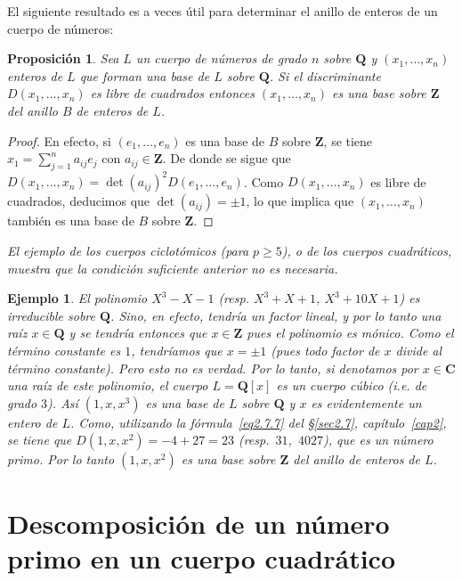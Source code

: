 \documentclass[10pt,oneside,bibtotoc,smallheadings,leqno,a5paper,DIV=12]{scrbook}
\newcommand{\QQ}{\mathbf{Q}}
\newcommand{\ZZ}{\mathbf{Z}}
\newcommand{\CC}{\mathbf{C}}
\numberwithin{equation}{section}
\newenvironment{comm}%
	{\begin{trivlist}\item\small\itshape}
	{\end{trivlist}}
\theoremstyle{defi}
\theoremstyle{enonce}
\newtheorem{proposition}{Proposici\'on}
\theoremstyle{rem}
\newtheorem*{example*}{Ejemplo}
\numberwithin{theorem}{section}
\numberwithin{proposition}{section}
\numberwithin{definition}{section}
\numberwithin{lemma}{section}
\numberwithin{corollary}{section}
\numberwithin{example}{section}
\numberwithin{footnote}{section}%
\begin{document}
El siguiente resultado es a veces \'util para determinar el anillo de enteros de un cuerpo de n\'umeros:

\begin{proposition}
Sea $L$ un cuerpo de n\'umeros de grado $n$ sobre $\QQ$ y $(x_{1},\dots,x_{n})$ enteros de $L$
que forman una base de $L$ sobre $\QQ$. Si el discriminante $D(x_{1},\dots,x_{n})$ es libre de cuadrados
entonces $(x_{1},\dots,x_{n})$ es una base sobre $\ZZ$ del anillo $B$ de enteros de $L$.
\end{proposition}

\begin{proof}
En efecto, si $(e_{1},\dots,e_{n})$ es una base de $B$ sobre $\ZZ$, se tiene $x_{1}=\sum_{j=1}^{n}a_{ij}e_{j}$
con $a_{ij}\in\ZZ$. De donde se sigue que $D(x_{1},\dots,x_{n})=\det(a_{ij})^{2}D(e_{1},\dots,e_{n})$.
Como $D(x_{1},\dots,x_{n})$ es libre de cuadrados, deducimos que $\det(a_{ij})=\pm 1$, lo que implica que
$(x_{1},\dots,x_{n})$ tambi\'en es una base de $B$ sobre $\ZZ$.
\end{proof}

\begin{comm}
El ejemplo de los cuerpos ciclot\'omicos (para $p\geq 5$), o de los cuerpos cuadr\'aticos, muestra que
la condici\'on suficiente anterior no es necesaria.
\end{comm}

\begin{example*}
El polinomio $X^{3}-X-1$ (resp. $X^{3}+X+1$, $X^{3}+10X+1$) es {\em irreducible} sobre $\QQ$.
Sino, en efecto, tendr\'ia un factor lineal, y por lo tanto una ra\'iz $x\in\QQ$ y se tendr\'ia entonces
que $x\in\ZZ$ pues el polinomio es m\'onico. Como el t\'ermino constante es $1$, tendr\'iamos que
$x=\pm 1$ (pues todo factor de $x$ divide al t\'ermino constante). Pero esto no es verdad. Por lo tanto,
si denotamos por $x\in\CC$ una ra\'iz de este polinomio, el cuerpo $L = \QQ[x]$ es un {\em cuerpo c\'ubico}
(i.e. de grado $3$). As\'i $(1,x,x^{3})$ es una base de $L$ sobre $\QQ$ y $x$ es evidentemente un entero de
$L$. Como, utilizando la f\'ormula~\eqref{eq2.7.7} del \S\ref{sec2.7}, cap\'itulo~\ref{cap2}, se tiene
que $D(1,x,x^{2}) = -4+27 = 23$ (resp.~$31$,~$4027$), que es un n\'umero primo.  Por lo tanto
$(1,x,x^{2})$ es una base sobre $\ZZ$ del anillo de enteros de $L$.
\end{example*}

\section{Descomposici\'on de un n\'umero primo en un cuerpo cuadr\'atico}\label{sec5.4}
\end{document}
